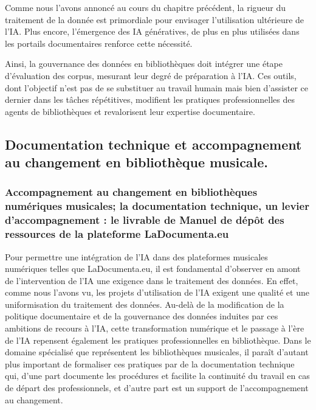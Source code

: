 Comme nous l'avons annoncé au cours du chapitre précédent, la rigueur du traitement de la donnée est primordiale pour envisager l'utilisation ultérieure de l'IA. Plus encore, l'émergence des IA génératives, de plus en plus utilisées dans les portails documentaires renforce cette nécessité. 

Ainsi, la gouvernance des données en bibliothèques doit intégrer une étape d'évaluation des corpus, mesurant leur degré de préparation à l'IA. 
Ces outils, dont l'objectif n'est pas de se substituer au travail humain mais bien d'assister ce dernier dans les tâches répétitives, modifient les pratiques professionnelles des agents de bibliothèques et revalorisent leur expertise documentaire. 



\subsection*{Documentation technique et accompagnement au changement en bibliothèque musicale.}

	\subsubsection*{Accompagnement au changement en bibliothèques numériques musicales; la documentation technique, un levier d'accompagnement : le livrable de Manuel de dépôt des ressources de la plateforme LaDocumenta.eu}

Pour permettre une intégration de l'IA dans des plateformes musicales numériques telles que LaDocumenta.eu, il est fondamental d'observer en amont de l'intervention de l'IA une exigence dans le traitement des données. En effet, comme nous l'avons vu, les projets d'utilisation de l'IA exigent une qualité et une uniformisation du traitement des données. Au-delà de la modification de la politique documentaire et de la gouvernance des données induites par ces ambitions de recours à l'IA, cette transformation numérique et le passage à l'ère de l'IA repensent également les pratiques professionnelles en bibliothèque. Dans le domaine spécialisé que représentent les bibliothèques musicales, il paraît d'autant plus important de formaliser ces pratiques par de la documentation technique qui, d'une part documente les procédures et facilite la continuité du travail en cas de départ des professionnels, et d'autre part est un support de l'accompagnement au changement. 

